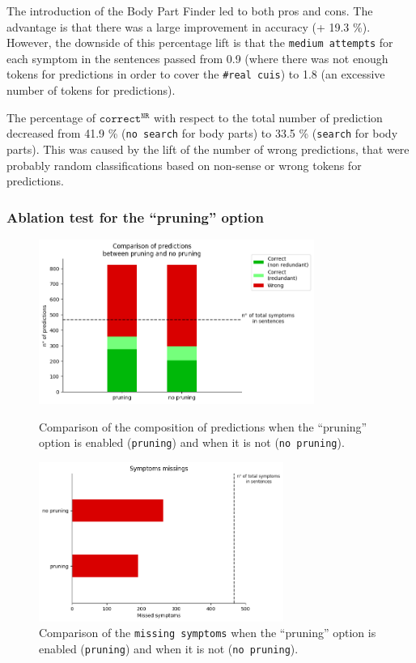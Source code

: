 \begin{itemize}

The introduction of the Body Part Finder led to both pros and cons. The advantage is that there was a large improvement in accuracy (+ 19.3 \%). However, the downside of this percentage lift is that the \texttt{medium attempts} for each symptom in the sentences passed from 0.9 (where there was not enough tokens for predictions in order to cover the \texttt{\#real cuis}) to 1.8 (an excessive number of tokens for predictions).

The percentage of $\texttt{correct}^{\texttt{NR}}$ with respect to the total number of prediction decreased from 41.9 \% (\texttt{no search} for body parts) to 33.5 \% (\texttt{search} for body parts). This was caused by the lift of the number of wrong predictions, that were probably random classifications based on non-sense or wrong tokens for predictions. %


\newpage
\subsubsection{Ablation test for the ``pruning'' option}

\begin{figure}[h]%
  \centering
  \begin{minipage}[b]{0.4\textwidth}
    \includegraphics[width=9cm]{graphs/comparison_pruning}
    \caption{Comparison of the composition of predictions when the ``pruning'' option is enabled (\texttt{pruning}) and when it is not (\texttt{no pruning}).}
  \end{minipage}
  \hfill
  \begin{minipage}[b]{0.4\textwidth}
    \includegraphics[width=8cm]{graphs/comparison_pruning_missings}
    \caption{Comparison of the \texttt{missing symptoms} when the ``pruning'' option is enabled (\texttt{pruning}) and when it is not (\texttt{no pruning}).}
  \end{minipage}
\end{figure}


\end{itemize}
